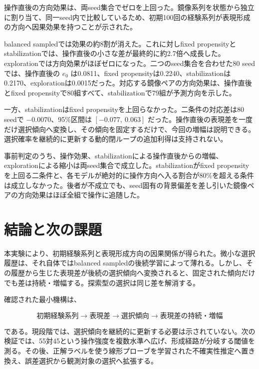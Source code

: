 \documentclass[11pt,a4paper]{ltjsarticle}
\begin{document}
操作直後の方向効果は、両seed集合でゼロを上回った。鏡像系列を状態から独立に割り当て、同一seed内で比較しているため、初期100回の経験系列が表現形成の方向へ因果効果を持つことが示された。

balanced sampledでは効果の約8割が消えた。これに対しfixed propensityとstabilizationでは、操作直後の小さな差が最終的に約2.7倍へ成長した。explorationでは方向効果がほぼゼロになった。二つのseed集合を合わせた80 seedでは、操作直後の $e_0$ は0.0811、fixed propensityは0.2240、stabilizationは0.2170、explorationは0.0015だった。対応する鏡像ペアの方向効果は、操作直後とfixed propensityで80組すべて、stabilizationで79組が予測方向を示した。

一方、stabilizationはfixed propensityを上回らなかった。二条件の対応差は80 seedで $-0.0070$、95\%区間は $[-0.077,\ 0.063]$ だった。操作直後の表現差を一度だけ選択傾向へ変換し、その傾向を固定するだけで、今回の増幅は説明できる。選択確率を継続的に更新する動的閉ループの追加利得は支持されない。

事前判定のうち、操作効果、stabilizationによる操作直後からの増幅、explorationによる縮小は両seed集合で成立した。stabilizationがfixed propensityを上回る二条件と、各モデルが絶対的に操作方向へ入る割合が80\%を超える条件は成立しなかった。後者が不成立でも、seed固有の背景偏差を差し引いた鏡像ペアの方向効果はほぼ全組で操作に追随した。

\section{結論と次の課題}

本実験により、初期経験系列と表現形成方向の因果関係が得られた。微小な選択履歴は、それ自体ではbalanced sampledの後続学習によって薄れる。しかし、その履歴から生じた表現差が後続の選択傾向へ変換されると、固定された傾向だけでも差は持続・増幅する。探索型の選択は同じ差を解消する。

確認された最小機構は、

\begin{equation}
\boxed{
\text{初期経験系列}
\rightarrow
\text{表現差}
\rightarrow
\text{選択傾向}
\rightarrow
\text{表現差の持続・増幅}
}
\end{equation}

である。現段階では、選択傾向を継続的に更新する必要は示されていない。次の検証では、55対45という操作強度を複数水準へ広げ、形成経路が分岐する閾値を測る。その後、正解ラベルを使う線形プローブを学習された不確実性推定へ置き換え、誤差選択から観測対象の選択へ拡張する。
\end{document}
